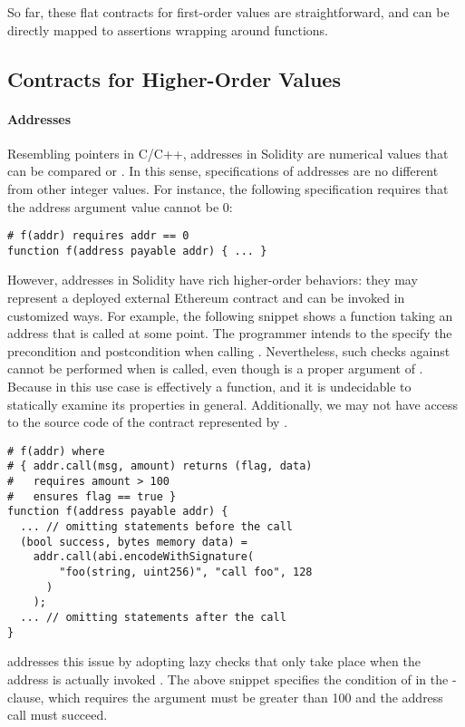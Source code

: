 So far, these flat contracts for first-order values are straightforward,
and can be directly mapped to assertions wrapping around functions.

\subsection{Contracts for Higher-Order Values}

\paragraph{Addresses}
Resembling pointers in C/C++, addresses in Solidity are numerical values
that can be compared or .
In this sense, specifications of addresses are no different
from other integer values.
For instance, the following specification requires that
the address argument value cannot be 0:
\begin{lstlisting}
# f(addr) requires addr == 0
function f(address payable addr) { ... }
\end{lstlisting}

However, addresses in Solidity have rich higher-order behaviors: they may
represent a deployed external Ethereum contract and can be invoked in
customized ways.
For example, the following snippet shows a function  taking an address
 that is called at some point.
The programmer intends to the specify the precondition and postcondition when
calling . 
Nevertheless, such checks against  cannot be performed when 
is called, even though  is a proper argument of .
Because  in this use case is effectively a function, and
it is undecidable to statically examine its properties in general.
Additionally, we may not have access to the source code of the contract
represented by .
\begin{lstlisting}
# f(addr) where
# { addr.call(msg, amount) returns (flag, data)
#   requires amount > 100
#   ensures flag == true }
function f(address payable addr) {
  ... // omitting statements before the call
  (bool success, bytes memory data) =
    addr.call(abi.encodeWithSignature(
        "foo(string, uint256)", "call foo", 128
      )
    );
  ... // omitting statements after the call
}
\end{lstlisting}
\lang addresses this issue by adopting lazy checks
\cite{DBLP:conf/icfp/FindlerF02} that only take place
when the address is actually invoked .
The above snippet specifies the condition of 
in the -clause, which requires
the  argument must be greater than 100 and
the address call must succeed.

